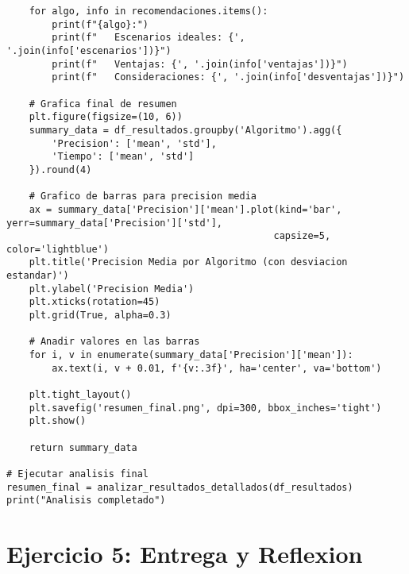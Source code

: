 \documentclass[12pt]{article}
\begin{document}
\begin{lstlisting}
    for algo, info in recomendaciones.items():
        print(f"{algo}:")
        print(f"   Escenarios ideales: {', '.join(info['escenarios'])}")
        print(f"   Ventajas: {', '.join(info['ventajas'])}")
        print(f"   Consideraciones: {', '.join(info['desventajas'])}")
    
    # Grafica final de resumen
    plt.figure(figsize=(10, 6))
    summary_data = df_resultados.groupby('Algoritmo').agg({
        'Precision': ['mean', 'std'],
        'Tiempo': ['mean', 'std']
    }).round(4)
    
    # Grafico de barras para precision media
    ax = summary_data['Precision']['mean'].plot(kind='bar', yerr=summary_data['Precision']['std'], 
                                               capsize=5, color='lightblue')
    plt.title('Precision Media por Algoritmo (con desviacion estandar)')
    plt.ylabel('Precision Media')
    plt.xticks(rotation=45)
    plt.grid(True, alpha=0.3)
    
    # Anadir valores en las barras
    for i, v in enumerate(summary_data['Precision']['mean']):
        ax.text(i, v + 0.01, f'{v:.3f}', ha='center', va='bottom')
    
    plt.tight_layout()
    plt.savefig('resumen_final.png', dpi=300, bbox_inches='tight')
    plt.show()
    
    return summary_data

# Ejecutar analisis final
resumen_final = analizar_resultados_detallados(df_resultados)
print("Analisis completado")
\end{lstlisting}

\section{Ejercicio 5: Entrega y Reflexion}
\end{document}
